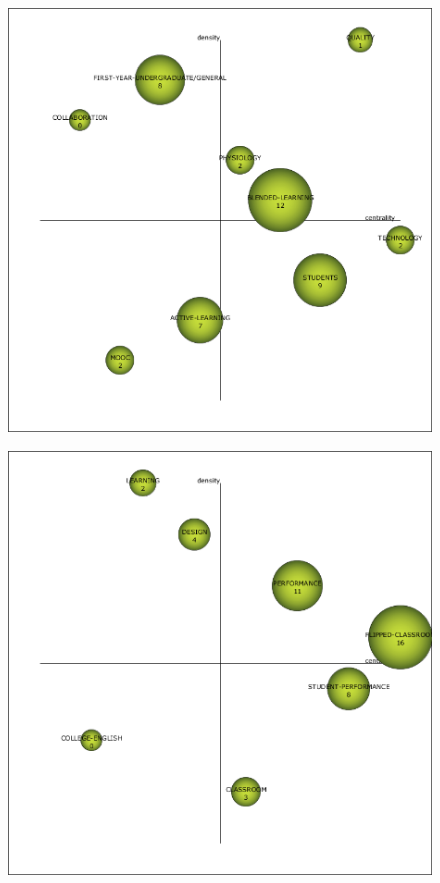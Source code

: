 \documentclass{textolivre}
\begin{document}
\begin{figure}[htbp]
\begin{minipage}{.45\textwidth}
 \label{fig03b}
 \end{minipage}
 \par\vspace{2ex}
 \begin{minipage}{.45\textwidth}
 \includegraphics[width=\textwidth]{Fig03c.png}
 \label{fig03c}
 \end{minipage}
 \hfill
 \begin{minipage}{.45\textwidth}
 \includegraphics[width=\textwidth]{Fig03d.png}

\end{minipage}
\end{figure}
\end{document}
